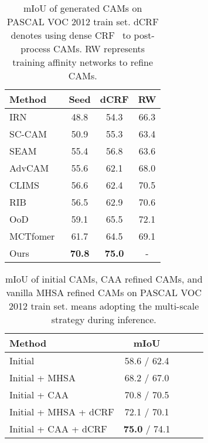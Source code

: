 \documentclass[10pt,twocolumn,letterpaper]{article}
\begin{document}
\begin{table}
  \centering
  \begin{tabular}{lccc}
    \toprule
    Method  & Seed   &  dCRF & RW\\
    \midrule
    IRN~\cite{Ahn2019IRN}       & 48.8        & 54.3  &  66.3\\
    SC-CAM~\cite{Chang2020sc-cam}  & 50.9        & 55.3  & 63.4\\
    SEAM~\cite{Wang2020SEAM}  & 55.4       & 56.8  &  63.6\\
AdvCAM~\cite{Lee2021advcam}  & 55.6       & 62.1 & 68.0 \\
    CLIMS~\cite{Xie_2022_CLIMS} & 56.6 & 62.4 & 70.5 \\
RIB~\cite{Lee2021ReducingIB} & 56.5 & 62.9 & 70.6 \\
    OoD~\cite{lee2022w--ood} & 59.1  &  65.5 & 72.1 \\
    MCTfomer~\cite{xu2022mctformer} & 61.7 & 64.5 & 69.1 \\
    Ours          & \textbf{70.8}   &  \textbf{75.0} & - \\
    \bottomrule
  \end{tabular}
  \caption{mIoU of generated CAMs on PASCAL VOC 2012 train set. dCRF denotes using dense CRF~\cite{CRF} to post-process CAMs. RW represents training affinity networks to refine CAMs.}
  \label{tab:cam_quality}
\end{table}


\begin{table}
  \centering
  \begin{tabular}{lcccc}
    \toprule
    Method      &     mIoU  \\
    \midrule
    Initial     &    58.6 / 62.4  \\
    \midrule
    Initial + MHSA &   68.2 / 67.0 \\
    Initial + CAA &   70.8 / 70.5 \\
    \midrule
    Initial + MHSA + dCRF & 72.1 / 70.1 \\
    Initial + CAA + dCRF & \textbf{75.0} / 74.1 \\
    \bottomrule
  \end{tabular}
  \caption{mIoU of initial CAMs, CAA refined CAMs, and vanilla MHSA refined CAMs on PASCAL VOC 2012 train set.  means adopting the multi-scale strategy during inference.}
  \vspace{-4mm}
  \label{tab:caa}
\end{table}
\end{document}
